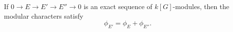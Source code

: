 If $0 \to E \to E' \to E'' \to 0$ is an exact sequence of $k[G]$-modules, then the modular characters satisfy
$$\phi_{E'} = \phi_E + \phi_{E''}.$$
